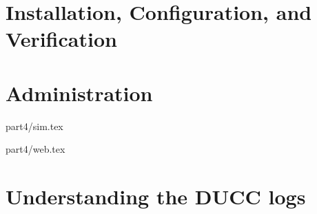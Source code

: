 % 
% 
% 
% 

\ifpdf
\else
{}
\fi
\chapter{Installation, Configuration, and Verification}


\ifpdf
\else
{}
\fi
\chapter{Administration}














 {part4/sim.tex}

 {part4/web.tex}

\chapter{Understanding the DUCC logs}


